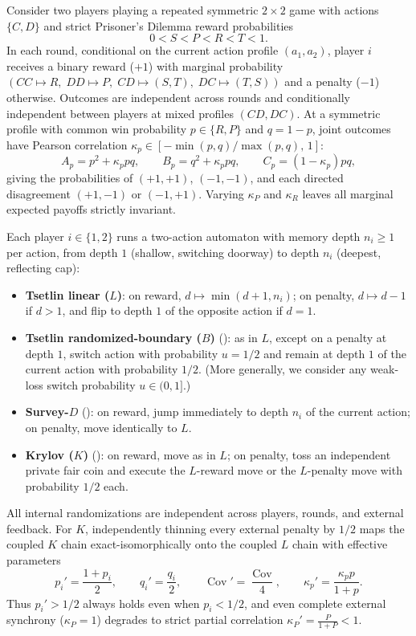 \documentclass[11pt,reqno]{amsart}
\theoremstyle{definition}
\theoremstyle{remark}
\DeclareMathOperator{\Cov}{Cov}
\begin{document}
Consider two players playing a repeated symmetric $2 \times 2$ game with actions $\{C, D\}$ and strict Prisoner's Dilemma reward probabilities
\begin{equation}\label{eq:pd-order}
  0 < S < P < R < T < 1.
\end{equation}
In each round, conditional on the current action profile $(a_1, a_2)$, player $i$ receives a binary reward ($+1$) with marginal probability $(CC \mapsto R,\; DD \mapsto P,\; CD \mapsto (S,T),\; DC \mapsto (T,S))$ and a penalty ($-1$) otherwise. Outcomes are independent across rounds and conditionally independent between players at mixed profiles $(CD, DC)$. At a symmetric profile with common win probability $p \in \{R, P\}$ and $q = 1-p$, joint outcomes have Pearson correlation $\kappa_p \in [-\min(p,q)/\max(p,q),\, 1]$:
\begin{equation}\label{eq:joint-law}
  A_p = p^2 + \kappa_p p q, \qquad
  B_p = q^2 + \kappa_p p q, \qquad
  C_p = (1-\kappa_p) p q,
\end{equation}
giving the probabilities of $(+1,+1)$, $(-1,-1)$, and each directed disagreement $(+1,-1)$ or $(-1,+1)$. Varying $\kappa_P$ and $\kappa_R$ leaves all marginal expected payoffs strictly invariant.

Each player $i \in \{1,2\}$ runs a two-action automaton with memory depth $n_i \ge 1$ per action, from depth $1$ (shallow, switching doorway) to depth $n_i$ (deepest, reflecting cap):
\begin{itemize}
  \item \textbf{Tsetlin linear ($L$)}: on reward, $d \mapsto \min(d+1, n_i)$; on penalty, $d \mapsto d-1$ if $d > 1$, and flip to depth $1$ of the opposite action if $d = 1$.
  \item \textbf{Tsetlin randomized-boundary ($B$)} (\cite[\S 6, p.~25]{Tsetlin1963}): as in $L$, except on a penalty at depth $1$, switch action with probability $u = 1/2$ and remain at depth $1$ of the current action with probability $1/2$. (More generally, we consider any weak-loss switch probability $u \in (0,1]$.)
  \item \textbf{Survey-$D$} (\cite[\S 2, pp.~11--13]{Tsetlin1963}): on reward, jump immediately to depth $n_i$ of the current action; on penalty, move identically to $L$.
  \item \textbf{Krylov ($K$)} (\cite{Krylov1963}): on reward, move as in $L$; on penalty, toss an independent private fair coin and execute the $L$-reward move or the $L$-penalty move with probability $1/2$ each.
\end{itemize}
All internal randomizations are independent across players, rounds, and external feedback. For $K$, independently thinning every external penalty by $1/2$ maps the coupled $K$ chain exact-isomorphically onto the coupled $L$ chain with effective parameters
\begin{equation}\label{eq:krylov-map}
  p_i' = \frac{1 + p_i}{2}, \qquad
  q_i' = \frac{q_i}{2}, \qquad
  \Cov' = \frac{\Cov}{4}, \qquad
  \kappa_p' = \frac{\kappa_p p}{1 + p}.
\end{equation}
Thus $p_i' > 1/2$ always holds even when $p_i < 1/2$, and even complete external synchrony ($\kappa_P = 1$) degrades to strict partial correlation $\kappa_P' = \frac{P}{1+P} < 1$.
\end{document}
